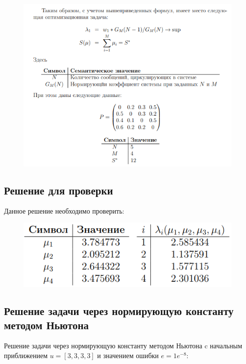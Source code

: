 \documentclass[14pt,a4paper,report]{report}
\begin{document}
\begin{figure}[h!]
	\centering
	\includegraphics[scale = 1.01]{images/1.png}
	\label{image:1}
\end{figure}

\subsection{Решение для проверки}

Данное решение необходимо проверить:

\begin{figure}[h!]
	\centering
	\includegraphics[scale = 0.8]{images/2.png}
	\label{image:2}
\end{figure}

\subsection{Решение задачи через нормирующую константу методом Ньютона}

Решение задачи через нормирующую константу методом Ньютона c начальным приближением $u=[3, 3, 3, 3]$ и значением ошибки $e=1e^{-8}$:
\end{document}

